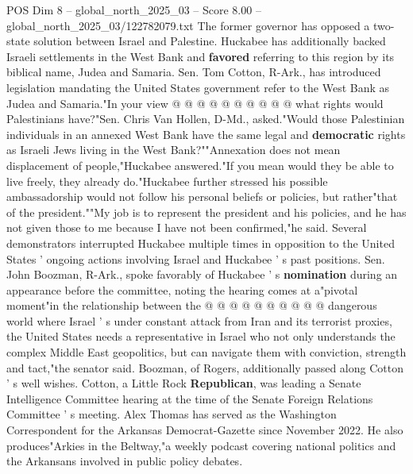 \begin{textsample}{POS Dim 8 – global\_north\_2025\_03 – Score 8.00 – global\_north\_2025\_03/122782079.txt}
The former governor has opposed a two-state solution between Israel and Palestine.
Huckabee has additionally backed Israeli settlements in the West Bank and \textbf{favored} referring to this region by its biblical name, Judea and Samaria.
Sen.
Tom Cotton, R-Ark., has introduced legislation mandating the United States government refer to the West Bank as Judea and Samaria."In your view @ @ @ @ @ @ @ @ @ @ what rights would Palestinians have?"Sen.
Chris Van Hollen, D-Md., asked."Would those Palestinian individuals in an annexed West Bank have the same legal and \textbf{democratic} rights as Israeli Jews living in the West Bank?""Annexation does not mean displacement of people,"Huckabee answered."If you mean would they be able to live freely, they already do."Huckabee further stressed his possible ambassadorship would not follow his personal beliefs or policies, but rather"that of the president.""My job is to represent the president and his policies, and he has not given those to me because I have not been confirmed,"he said.
Several demonstrators interrupted Huckabee multiple times in opposition to the United States ' ongoing actions involving Israel and Huckabee ' s past positions.
Sen.
John Boozman, R-Ark., spoke favorably of Huckabee ' s \textbf{nomination} during an appearance before the committee, noting the hearing comes at a"pivotal moment"in the relationship between the @ @ @ @ @ @ @ @ @ @ dangerous world where Israel ' s under constant attack from Iran and its terrorist proxies, the United States needs a representative in Israel who not only understands the complex Middle East geopolitics, but can navigate them with conviction, strength and tact,"the senator said.
Boozman, of Rogers, additionally passed along Cotton ' s well wishes.
Cotton, a Little Rock \textbf{Republican}, was leading a Senate Intelligence Committee hearing at the time of the Senate Foreign Relations Committee ' s meeting.
Alex Thomas has served as the Washington Correspondent for the Arkansas Democrat-Gazette since November 2022.
He also produces"Arkies in the Beltway,"a weekly podcast covering national politics and the Arkansans involved in public policy debates.

\end{textsample}
